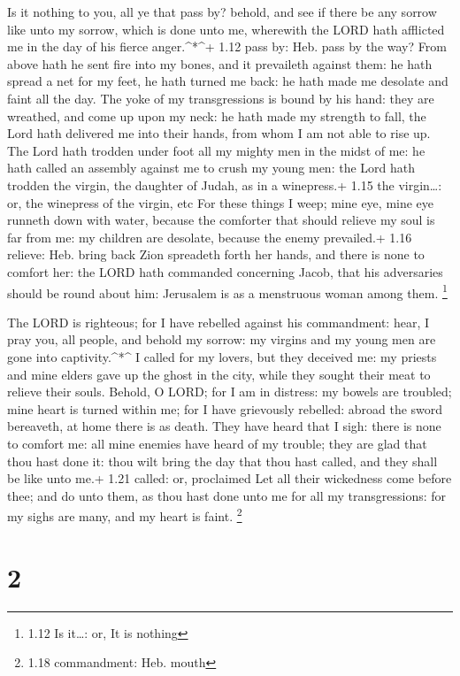 Is it nothing to you, all ye that pass by? behold, and see
if there be any sorrow like unto my sorrow, which is done unto me,
wherewith the LORD hath afflicted me in the day of his fierce
anger.\^{}*\^{}+ 1.12 pass by: Heb. pass by the way?  From
above hath he sent fire into my bones, and it prevaileth against them:
he hath spread a net for my feet, he hath turned me back: he hath made
me desolate and faint all the day.  The yoke of my
transgressions is bound by his hand: they are wreathed, and come up upon
my neck: he hath made my strength to fall, the Lord hath delivered me
into their hands, from whom I am not able to rise up.  The
Lord hath trodden under foot all my mighty men in the midst of me: he
hath called an assembly against me to crush my young men: the Lord hath
trodden the virgin, the daughter of Judah, as in a winepress.+ 1.15 the
virgin\ldots: or, the winepress of the virgin, etc  For
these things I weep; mine eye, mine eye runneth down with water, because
the comforter that should relieve my soul is far from me: my children
are desolate, because the enemy prevailed.+ 1.16 relieve: Heb. bring
back  Zion spreadeth forth her hands, and there is none to
comfort her: the LORD hath commanded concerning Jacob, that his
adversaries should be round about him: Jerusalem is as a menstruous
woman among them. \footnote{1.12 Is it\ldots: or, It is nothing}

 The LORD is righteous; for I have rebelled against his
commandment: hear, I pray you, all people, and behold my sorrow: my
virgins and my young men are gone into captivity.\^{}*\^{} 
I called for my lovers, but they deceived me: my priests and mine elders
gave up the ghost in the city, while they sought their meat to relieve
their souls.  Behold, O LORD; for I am in distress: my
bowels are troubled; mine heart is turned within me; for I have
grievously rebelled: abroad the sword bereaveth, at home there is as
death.  They have heard that I sigh: there is none to
comfort me: all mine enemies have heard of my trouble; they are glad
that thou hast done it: thou wilt bring the day that thou hast called,
and they shall be like unto me.+ 1.21 called: or, proclaimed
 Let all their wickedness come before thee; and do unto
them, as thou hast done unto me for all my transgressions: for my sighs
are many, and my heart is faint. \footnote{1.18 commandment: Heb. mouth}

\hypertarget{section-1}{%
\section{2}\label{section-1}}

